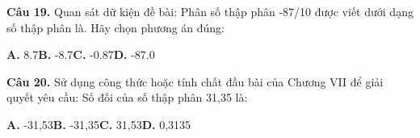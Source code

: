 \documentclass[11pt,a4paper]{article}
\begin{document}
\textbf{\color{primary} Câu 19.} Quan sát dữ kiện đề bài: Phân số thập phân -87/10 được viết dưới dạng số thập phân là. Hãy chọn phương án đúng:\par
\hspace*{1.5em}\textbf{A.} 8.7\quad\quad \textbf{B.} -8.7\quad\quad \textbf{C.} -0.87\quad\quad \textbf{D.} -87.0\par\vspace{2pt}
\textbf{\color{primary} Câu 20.} Sử dụng công thức hoặc tính chất đầu bài của Chương VII để giải quyết yêu cầu: Số đối của số thập phân 31,35 là:\par
\hspace*{1.5em}\textbf{A.} -31,53\quad\quad \textbf{B.} -31,35\quad\quad \textbf{C.} 31,53\quad\quad \textbf{D.} 0,3135\par\vspace{2pt}
\end{document}
